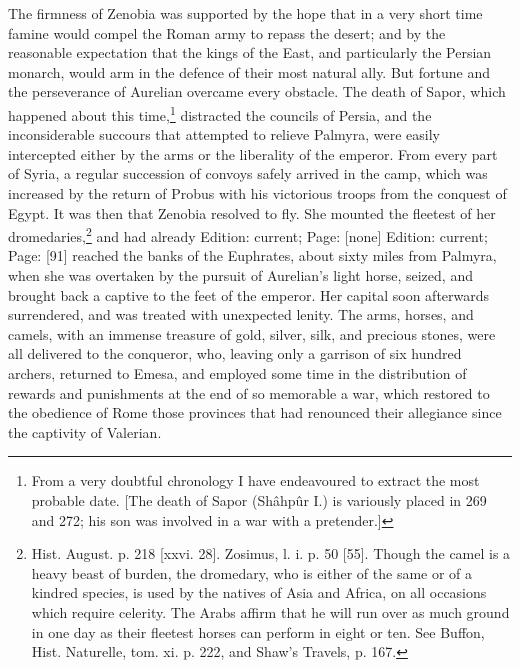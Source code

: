 The firmness of Zenobia was supported by the hope that in a very short time famine would compel the Roman army to repass the desert; and by the reasonable expectation that the kings of the East, and particularly the Persian monarch, would arm in the defence of their most natural ally. But fortune and the perseverance of Aurelian overcame every obstacle. The death of Sapor, which happened about this time,\footnote{From a very doubtful chronology I have endeavoured to extract the most probable date. [The death of Sapor (Shâhpûr I.) is variously placed in 269 and 272; his son was involved in a war with a pretender.]} distracted the councils of Persia, and the inconsiderable succours that attempted to relieve Palmyra, were easily intercepted either by the arms or the liberality of the emperor. From every part of Syria, a regular succession of convoys safely arrived in the camp, which was increased by the return of Probus with his victorious troops from the conquest of Egypt. It was then that Zenobia resolved to fly. She mounted the fleetest of her dromedaries,\footnote{Hist. August. p. 218 [xxvi. 28]. Zosimus, l. i. p. 50 [55]. Though the camel is a heavy beast of burden, the dromedary, who is either of the same or of a kindred species, is used by the natives of Asia and Africa, on all occasions which require celerity. The Arabs affirm that he will run over as much ground in one day as their fleetest horses can perform in eight or ten. See Buffon, Hist. Naturelle, tom. xi. p. 222, and Shaw\texthebrew{}’s Travels, p. 167.} and had already Edition: current; Page: [none] Edition: current; Page: [91] reached the banks of the Euphrates, about sixty miles from Palmyra, when she was overtaken by the pursuit of Aurelian\texthebrew{}’s light horse, seized, and brought back a captive to the feet of the emperor. Her capital soon afterwards surrendered, and was treated with unexpected lenity. The arms, horses, and camels, with an immense treasure of gold, silver, silk, and precious stones, were all delivered to the conqueror, who, leaving only a garrison of six hundred archers, returned to Emesa, and employed some time in the distribution of rewards and punishments at the end of so memorable a war, which restored to the obedience of Rome those provinces that had renounced their allegiance since the captivity of Valerian.

